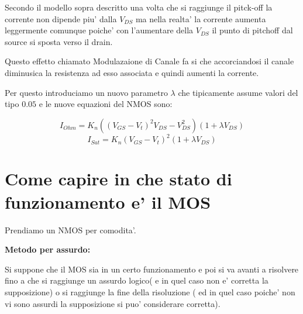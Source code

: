 \documentclass[\main/main.tex]{subfiles}
\begin{document}
Secondo il modello sopra descritto una volta che si raggiunge il pitck-off la corrente non dipende piu' dalla $V_{DS}$ ma nella realta' la corrente aumenta leggermente comunque poiche' con l'aumentare della $V_{DS}$ il punto di pitchoff dal source si sposta verso il drain.

Questo effetto chiamato Modulazaione di Canale fa si che accorciandosi il canale diminusica la resistenza ad esso associata e quindi aumenti la corrente.

Per questo introduciamo un nuovo parametro $\lambda$ che tipicamente assume valori del tipo $0.05$ e le nuove equazioni del NMOS sono:

\[ I_{Ohm} = K_n \left( (V_{GS} - V_t)^2 V_{DS} - V_{DS}^2 \right)(1+\lambda V_{DS})\]
\[ I_{Sat} = K_n \left( V_{GS} - V_t \right)^2(1+\lambda V_{DS})\]

\begin{figure}[H]
    \center
\end{figure}

\clearpage
\section{Come capire in che stato di funzionamento e' il MOS}
Prendiamo un NMOS per comodita'.

\textbf{Metodo per assurdo:}

Si suppone che il MOS sia in un certo funzionamento e poi si va avanti a risolvere fino a che si raggiunge un assurdo logico( e in quel caso non e' corretta la supposizione) o si raggiunge la fine della risoluzione ( ed in quel caso poiche' non vi sono assurdi la supposizione si puo' considerare corretta).
\end{document}
